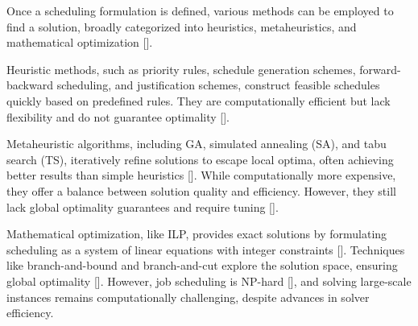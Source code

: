 \documentclass[12pt]{article}
\begin{document}
Once a scheduling formulation is defined, various methods can be employed to find a solution, broadly categorized into heuristics, metaheuristics, and mathematical optimization []. 

Heuristic methods, such as priority rules, schedule generation schemes, forward-backward scheduling, and justification schemes, construct feasible schedules quickly based on predefined rules. They are computationally efficient but lack flexibility and do not guarantee optimality []. %

Metaheuristic algorithms, including GA, simulated annealing (SA), and tabu search (TS), iteratively refine solutions to escape local optima, often achieving better results than simple heuristics []. While computationally more expensive, they offer a balance between solution quality and efficiency. However, they still lack global optimality guarantees and require tuning [].

Mathematical optimization, like ILP, provides exact solutions by formulating scheduling as a system of linear equations with integer constraints []. Techniques like branch-and-bound and branch-and-cut explore the solution space, ensuring global optimality []. However, job scheduling is NP-hard [], and solving large-scale instances remains computationally challenging, despite advances in solver efficiency.






\end{document}
